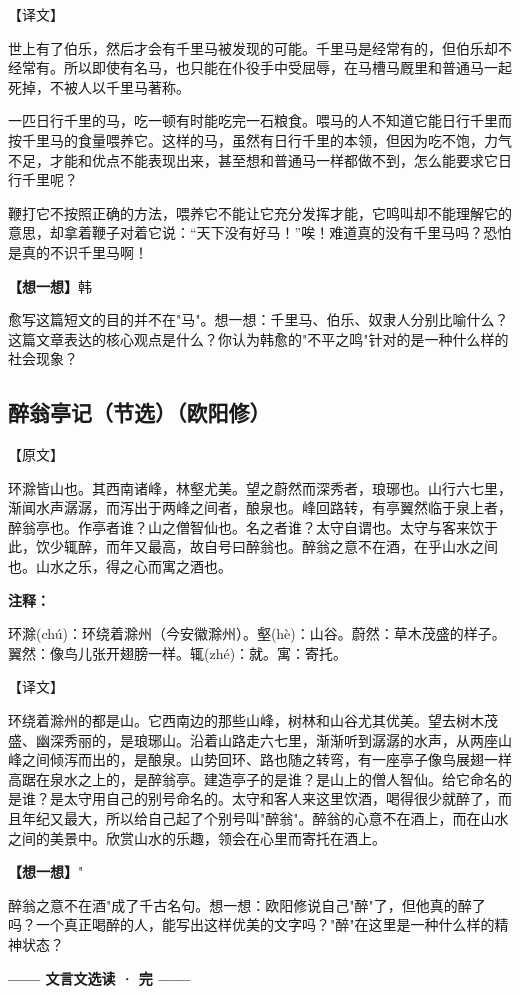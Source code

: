 \documentclass[a4paper,12pt]{ctexart}
\newcommand{\annlist}[1]{{\vspace{0.15cm}\noindent\textcolor{orange!80!black}{\small\bfseries 注释：}\par\footnotesize #1\par}}
\newcommand{\thinkq}[1]{\vspace{0.2cm}\noindent\textcolor{orange!60!black}{\small\bfseries【想一想】}{\small #1}\par}
\begin{document}
\noindent\textcolor{green!60!black}{\large【译文】}

世上有了伯乐，然后才会有千里马被发现的可能。千里马是经常有的，但伯乐却不经常有。所以即使有名马，也只能在仆役手中受屈辱，在马槽马厩里和普通马一起死掉，不被人以千里马著称。

一匹日行千里的马，吃一顿有时能吃完一石粮食。喂马的人不知道它能日行千里而按千里马的食量喂养它。这样的马，虽然有日行千里的本领，但因为吃不饱，力气不足，才能和优点不能表现出来，甚至想和普通马一样都做不到，怎么能要求它日行千里呢？

鞭打它不按照正确的方法，喂养它不能让它充分发挥才能，它鸣叫却不能理解它的意思，却拿着鞭子对着它说：\textquotedblleft 天下没有好马！\textquotedblright 唉！难道真的没有千里马吗？恐怕是真的不识千里马啊！

\thinkq 韩愈写这篇短文的目的并不在"马"。想一想：千里马、伯乐、奴隶人分别比喻什么？这篇文章表达的核心观点是什么？你认为韩愈的"不平之鸣"针对的是一种什么样的社会现象？

\newpage

\subsection*{醉翁亭记（节选）（欧阳修）}

\noindent\textcolor{blue!70!black}{\large【原文】}

环滁皆山也。其西南诸峰，林壑尤美。望之蔚然而深秀者，琅琊也。山行六七里，渐闻水声潺潺，而泻出于两峰之间者，酿泉也。峰回路转，有亭翼然临于泉上者，醉翁亭也。作亭者谁？山之僧智仙也。名之者谁？太守自谓也。太守与客来饮于此，饮少辄醉，而年又最高，故自号曰醉翁也。醉翁之意不在酒，在乎山水之间也。山水之乐，得之心而寓之酒也。

\annlist{环滁(chú)：环绕着滁州（今安徽滁州）。壑(hè)：山谷。蔚然：草木茂盛的样子。翼然：像鸟儿张开翅膀一样。辄(zhé)：就。寓：寄托。}

\noindent\textcolor{green!60!black}{\large【译文】}

环绕着滁州的都是山。它西南边的那些山峰，树林和山谷尤其优美。望去树木茂盛、幽深秀丽的，是琅琊山。沿着山路走六七里，渐渐听到潺潺的水声，从两座山峰之间倾泻而出的，是酿泉。山势回环、路也随之转弯，有一座亭子像鸟展翅一样高踞在泉水之上的，是醉翁亭。建造亭子的是谁？是山上的僧人智仙。给它命名的是谁？是太守用自己的别号命名的。太守和客人来这里饮酒，喝得很少就醉了，而且年纪又最大，所以给自己起了个别号叫"醉翁"。醉翁的心意不在酒上，而在山水之间的美景中。欣赏山水的乐趣，领会在心里而寄托在酒上。

\thinkq "醉翁之意不在酒"成了千古名句。想一想：欧阳修说自己"醉"了，但他真的醉了吗？一个真正喝醉的人，能写出这样优美的文字吗？"醉"在这里是一种什么样的精神状态？

\vspace{0.5cm}

\begin{center}
\textcolor{blue!70!black}{\large\textbf{—— 文言文选读 · 完 ——}}
\end{center}
\end{document}
